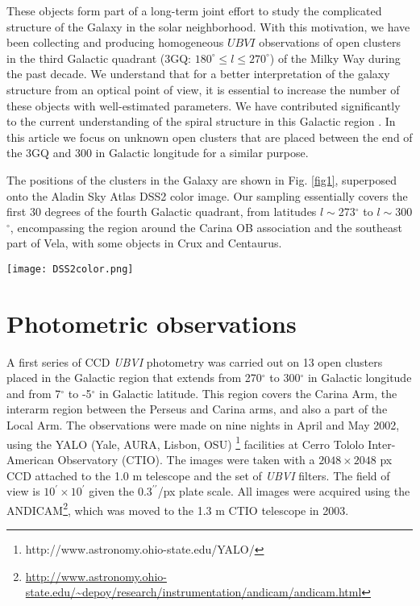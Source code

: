\documentclass[draft]{aa}
\begin{document}
These objects form part of a long-term joint effort to study the
complicated structure of the Galaxy in the solar neighborhood. With this
motivation, we have been collecting and producing
homogeneous $UBVI$ observations of open clusters in the third Galactic quadrant
(3GQ: $180^\circ\leq l \leq270^\circ$) of the Milky Way during the past decade.
We understand that for a better interpretation of the galaxy structure from an
optical point of view, it is essential to increase the number of these  objects
with well-estimated parameters. We have contributed significantly to the
current understanding of the spiral structure in this Galactic region
\citep{Carraro_2005,Moitinho_2006,Vazquez2008,Carraro_2010}.
In this article we focus on unknown open clusters that are placed
between the end of the 3GQ and 300 in Galactic longitude for a similar
purpose.

The positions of the clusters in the Galaxy are shown in Fig. \ref{fig1}, superposed
onto the Aladin Sky Atlas DSS2 color image. Our sampling essentially covers the
first 30 degrees of the fourth Galactic quadrant, from latitudes
$l\sim$273$^\circ$ to $l\sim$300$^\circ$, encompassing the region around the
Carina OB association and the southeast part of Vela, with some objects in Crux
and Centaurus.


\begin{figure*}[ht]
    \centering
    \texttt{[image: DSS2color.png]}
    \caption{Aladin DSS2 color image showing with white circles the positions of
    the clusters we survey here. The Galactic coordinates $l$
    and $b$ are depicted by a green grid, and constellation limits for Carina,
    Vela, Centaurus, and Crux are plotted as yellow lines.}
    \label{fig1}
\end{figure*}




\section{Photometric observations}
\label{sec:photo_obs}

A first series of CCD \emph{UBVI} photometry was carried out on 13 open clusters
placed in the Galactic region that extends from 270$^\circ$ to 300$^\circ$ in Galactic
longitude and from 7$^\circ$ to -5$^\circ$ in Galactic latitude. This region
covers the Carina Arm, the interarm region between the Perseus and Carina arms,
and also a part of the Local Arm.
%
The observations were made on nine nights in April and May 2002, using the YALO
(Yale, AURA, Lisbon, OSU)
\footnote{http://www.astronomy.ohio-state.edu/YALO/}
facilities at Cerro Tololo Inter-American
Observatory (CTIO). The images were taken with a $2048\times2048$ px CCD
attached to the 1.0 m telescope and the set of \textit{UBVI} filters.
The field of view is $10^\prime\times10^\prime$ given the
$0.3^{\prime\prime}$/px plate scale. All images were acquired using the
ANDICAM\footnote{\url{http://www.astronomy.ohio-state.edu/~depoy/research/instrumentation/andicam/andicam.html}},
which was moved to the 1.3 m CTIO telescope in 2003.
\end{document}
